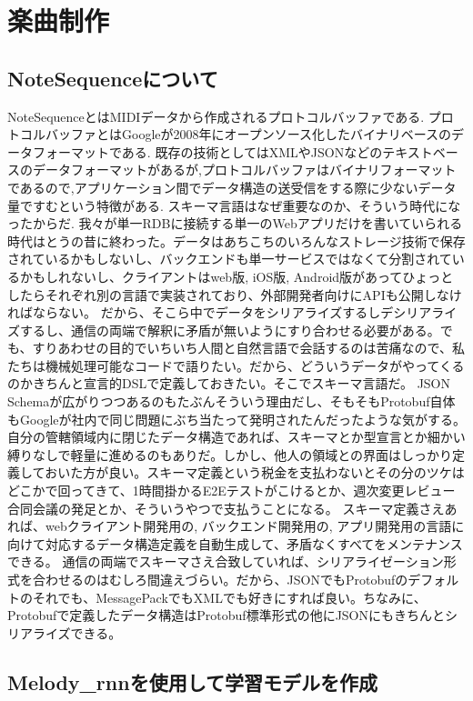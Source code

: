 \chapter{楽曲制作}
\section{NoteSequenceについて}
NoteSequenceとはMIDIデータから作成されるプロトコルバッファである.
プロトコルバッファとはGoogleが2008年にオープンソース化したバイナリベースのデータフォーマットである.
既存の技術としてはXMLやJSONなどのテキストベースのデータフォーマットがあるが,プロトコルバッファはバイナリフォーマットであるので,アプリケーション間でデータ構造の送受信をする際に少ないデータ量ですむという特徴がある.
スキーマ言語はなぜ重要なのか、そういう時代になったからだ.
我々が単一RDBに接続する単一のWebアプリだけを書いていられる時代はとうの昔に終わった。データはあちこちのいろんなストレージ技術で保存されているかもしないし、バックエンドも単一サービスではなくて分割されているかもしれないし、クライアントはweb版, iOS版, Android版があってひょっとしたらそれぞれ別の言語で実装されており、外部開発者向けにAPIも公開しなければならない。
だから、そこら中でデータをシリアライズするしデシリアライズするし、通信の両端で解釈に矛盾が無いようにすり合わせる必要がある。でも、すりあわせの目的でいちいち人間と自然言語で会話するのは苦痛なので、私たちは機械処理可能なコードで語りたい。だから、どういうデータがやってくるのかきちんと宣言的DSLで定義しておきたい。そこでスキーマ言語だ。
JSON Schemaが広がりつつあるのもたぶんそういう理由だし、そもそもProtobuf自体もGoogleが社内で同じ問題にぶち当たって発明されたんだったような気がする。
自分の管轄領域内に閉じたデータ構造であれば、スキーマとか型宣言とか細かい縛りなしで軽量に進めるのもありだ。しかし、他人の領域との界面はしっかり定義しておいた方が良い。スキーマ定義という税金を支払わないとその分のツケはどこかで回ってきて、1時間掛かるE2Eテストがこけるとか、週次変更レビュー合同会議の発足とか、そういうやつで支払うことになる。
スキーマ定義さえあれば、webクライアント開発用の, バックエンド開発用の, アプリ開発用の言語に向けて対応するデータ構造定義を自動生成して、矛盾なくすべてをメンテナンスできる。
通信の両端でスキーマさえ合致していれば、シリアライゼーション形式を合わせるのはむしろ間違えづらい。だから、JSONでもProtobufのデフォルトのそれでも、MessagePackでもXMLでも好きにすれば良い。ちなみに、Protobufで定義したデータ構造はProtobuf標準形式の他にJSONにもきちんとシリアライズできる。
\section{Melody\_rnnを使用して学習モデルを作成}
